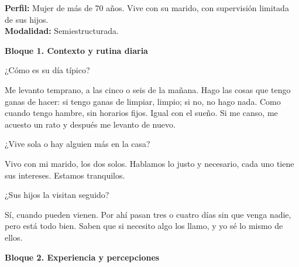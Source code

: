 \noindent\textbf{Perfil:} Mujer de más de 70 años. Vive con su marido, con supervisión limitada de sus hijos.\\
\noindent\textbf{Modalidad:} Semiestructurada.

\bigskip
\textbf{Bloque 1. Contexto y rutina diaria}

\begin{description}[leftmargin=0cm, labelsep=0.5cm]

    \item[\textbf{Entrevistador:}] ¿Cómo es su día típico?

    \item[\textbf{Entrevistada:}] Me levanto temprano, a las cinco o seis de la mañana.
    Hago las cosas que tengo ganas de hacer: si tengo ganas de limpiar, limpio; si no, no hago nada.
    Como cuando tengo hambre, sin horarios fijos.
    Igual con el sueño.
    Si me canso, me acuesto un rato y después me levanto de nuevo.

    \item[\textbf{Entrevistador:}] ¿Vive sola o hay alguien más en la casa?

    \item[\textbf{Entrevistada:}] Vivo con mi marido, los dos solos.
    Hablamos lo justo y necesario, cada uno tiene sus intereses.
    Estamos tranquilos.

    \item[\textbf{Entrevistador:}] ¿Sus hijos la visitan seguido?

    \item[\textbf{Entrevistada:}] Sí, cuando pueden vienen.
    Por ahí pasan tres o cuatro días sin que venga nadie, pero está todo bien.
    Saben que si necesito algo los llamo, y yo sé lo mismo de ellos.

\end{description}

\bigskip
\textbf{Bloque 2. Experiencia y percepciones}

